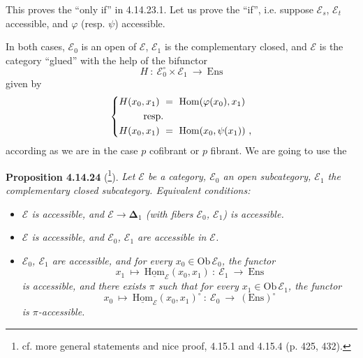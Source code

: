 \documentclass[11pt]{article}
\newcommand{\msp}[1]{\marginpar{\footnotesize [#1]}}
\newcommand{\uHom}{\underline{\mathrm{Hom}}}
\newcommand{\bDelta}{\boldsymbol{\Delta}}
\newcommand{\Ens}{\mathrm{Ens}}
\newcommand{\Ob}{\mathrm{Ob}\,}
\newcommand{\Hom}{\mathrm{Hom}}
\begin{document}
This proves the ``only if'' in 4.14.23.1. Let us prove the ``if'', i.e. suppose $\mathcal{E}_s$, $\mathcal{E}_t$ accessible, and $\varphi$ (resp. $\psi$) accessible.

\msp{page 413}

In both cases, $\mathcal{E}_0$ is an open of $\mathcal{E}$, $\mathcal{E}_1$ is the complementary closed, and $\mathcal{E}$ is the category ``glued'' with the help of the bifunctor
\[
H\ :\ \mathcal{E}_0^{\circ}\times\mathcal{E}_1\ \longrightarrow\ \Ens
\]
given by
\[
\left\{
\begin{aligned}
H(x_0,x_1)\ &=\ \Hom(\varphi(x_0),x_1)\\
&\hspace{-2em}\text{resp.}\\
H(x_0,x_1)\ &=\ \Hom(x_0,\psi(x_1))\ ,
\end{aligned}
\right.
\]
according as we are in the case $p$ cofibrant or $p$ fibrant. We are going to use the

\textbf{Proposition 4.14.24} (\footnote[173]{cf. more general statements and nice proof, 4.15.1 and 4.15.4 (p. 425, 432).}). \textit{Let $\mathcal{E}$ be a category, $\mathcal{E}_0$ an open subcategory, $\mathcal{E}_1$ the complementary closed subcategory. Equivalent conditions:}
\begin{itemize}[leftmargin=*]
\item[\textit{a)}] \textit{$\mathcal{E}$ is accessible, and $\mathcal{E}\longrightarrow\bDelta_1$ (with fibers $\mathcal{E}_0$, $\mathcal{E}_1$) is accessible.}
\item[\textit{b)}] \textit{$\mathcal{E}$ is accessible, and $\mathcal{E}_0$, $\mathcal{E}_1$ are accessible in $\mathcal{E}$.}
\item[\textit{c)}] \textit{$\mathcal{E}_0$, $\mathcal{E}_1$ are accessible, and for every $x_0\in\Ob\mathcal{E}_0$, the functor}
\[
x_1\ \longmapsto\ \uHom_{\mathcal{E}}(x_0,x_1)\ :\ \mathcal{E}_1\ \longrightarrow\ \Ens
\]
\msp{page 414}
\textit{is accessible, and there exists $\pi$ such that for every $x_1\in\Ob\mathcal{E}_1$, the functor}
\[
x_0\ \longmapsto\ \uHom_{\mathcal{E}}(x_0,x_1)^{\circ}\ :\ \mathcal{E}_0\ \longrightarrow\ (\Ens)^{\circ}
\]
\textit{is $\pi$-accessible.}
\end{itemize}
\end{document}
